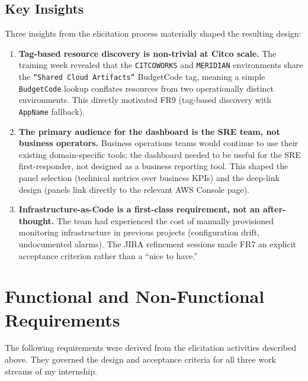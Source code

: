 \subsection{Key Insights}

Three insights from the elicitation process materially shaped the
resulting design:

\begin{enumerate}
    \item \textbf{Tag-based resource discovery is non-trivial at Citco
          scale.} The training week revealed that the \texttt{CITCOWORKS}
          and \texttt{MERIDIAN} environments share the
          \texttt{``Shared Cloud Artifacts''} BudgetCode tag, meaning
          a simple \texttt{BudgetCode} lookup conflates resources from
          two operationally distinct environments. This directly
          motivated FR9 (tag-based discovery with \texttt{AppName}
          fallback).

    \item \textbf{The primary audience for the dashboard is the SRE
          team, not business operators.} Business operations teams would
          continue to use their existing domain-specific tools; the
          dashboard needed to be useful for the SRE first-responder,
          not designed as a business reporting tool. This shaped the
          panel selection (technical metrics over business KPIs) and
          the deep-link design (panels link directly to the relevant AWS
          Console page).

    \item \textbf{Infrastructure-as-Code is a first-class requirement,
          not an after-thought.} The team had experienced the cost of
          manually provisioned monitoring infrastructure in previous
          projects (configuration drift, undocumented alarms). The JIRA
          refinement sessions made FR7 an explicit acceptance criterion
          rather than a ``nice to have.''
\end{enumerate}

\section{Functional and Non-Functional Requirements}
\label{sec:requirements}

The following requirements were derived from the elicitation activities
described above. They governed the design and acceptance criteria for
all three work streams of my internship.

